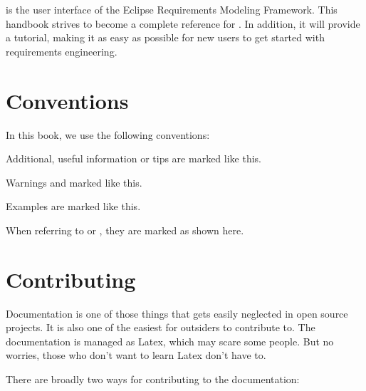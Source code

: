 \pror{} is the user interface of the Eclipse Requirements Modeling Framework.  This handbook strives to become a complete reference for \pror{}.  In addition, it will provide a tutorial, making it as easy as possible for new users to get started with requirements engineering.

\section{Conventions}

In this book, we use the following conventions:

\begin{info}
Additional, useful information or tips are marked like this.
\end{info}

\begin{warning}
Warnings and marked like this.
\end{warning}

\begin{example}
Examples are marked like this.
\end{example}

When referring to  or , they are marked as shown here.


\section{Contributing}

Documentation is one of those things that gets easily neglected in open source projects.  It is also one of the easiest for outsiders to contribute to.  The documentation is managed as Latex, which may scare some people.  But no worries, those who don't want to learn Latex don't have to.

There are broadly two ways for contributing to the documentation:

